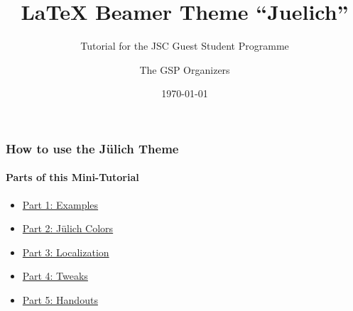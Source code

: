 {
\title{\LaTeX{} Beamer Theme ``Juelich''}
\subtitle{Tutorial for the JSC Guest Student Programme}
\author{The GSP Organizers}
\date{\today}
\maketitle

\begin{frame}
        \frametitle{How to use the Jülich Theme}
        \framesubtitle{Parts of this Mini-Tutorial}
        \begin{itemize}
          \item \hyperlink{examples}{Part 1: Examples}
          \item \hyperlink{colors}{Part 2: Jülich Colors}
          \item \hyperlink{localization}{Part 3: Localization}
          \item \hyperlink{tweaks}{Part 4: Tweaks}
          \item \hyperlink{handouts}{Part 5: Handouts}
    \end{itemize}
\end{frame}












}
